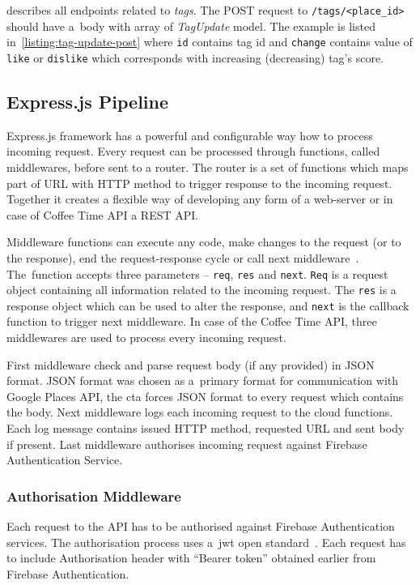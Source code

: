  describes all endpoints related to \textit{tags}. The POST request to \verb|/tags/<place_id>| should have a~body with array of \textit{TagUpdate} model. The example is listed in~\cref{listing:tag-update-post} where \verb|id| contains tag id and \verb|change| contains value of \verb|like| or \verb|dislike| which corresponds with increasing (decreasing) tag's score. 
\subsection{Express.js Pipeline}
Express.js framework has a powerful and configurable way how to process incoming request. Every request can be processed through functions, called middlewares, before sent to a router. The router is a set of functions which maps part of URL with HTTP method to trigger response to the incoming request. Together it creates a flexible way of developing any form of a web-server or in case of Coffee Time API a REST API. 

Middleware functions can execute any code, make changes to the request (or to the response), end the request-response cycle or call next middleware~\cite{express-js-middleware}. The~function accepts three parameters -- \verb|req|, \verb|res| and \verb|next|. \verb|Req| is a request object containing all information related to the incoming request. The \verb|res| is a response object which can be used to alter the response, and \verb|next| is the callback function to trigger next middleware. In case of the Coffee Time API, three middlewares are used to process every incoming request.

First middleware check and parse request body (if any provided) in JSON format. JSON format was chosen as a~primary format for communication with Google Places API, the \gls{cta} forces JSON format to every request which contains the body. Next middleware logs each incoming request to the cloud functions. Each log message contains issued HTTP method, requested URL and sent body if present. Last middleware authorises incoming request against Firebase Authentication Service.

\subsubsection{Authorisation Middleware}
Each request to the API has to be authorised against Firebase Authentication services. The authorisation process uses a~\gls{jwt} open standard~\cite{jwt-intro}. Each request has to include Authorisation header with ``Bearer token'' obtained earlier from Firebase Authentication. 

